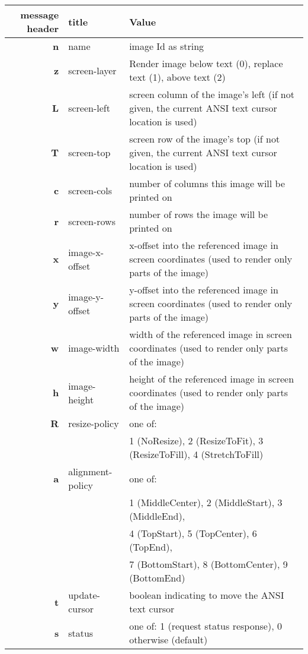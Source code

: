 \documentclass[a4paper]{article}
\begin{document}
\begin{tabular}{ |r|l|l| }
    \hline
    \textbf{message header}   & \textbf{title}   & \textbf{Value} \\
    \hline
    \textbf{n} & name             & image Id as string \\
    \textbf{z} & screen-layer     & Render image below text (0), replace text (1), above text (2) \\
    \textbf{L} & screen-left      & screen column of the image's left (if not given, the current ANSI text cursor location is used) \\
    \textbf{T} & screen-top       & screen row of the image's top (if not given, the current ANSI text cursor location is used) \\
    \textbf{c} & screen-cols      & number of columns this image will be printed on \\
    \textbf{r} & screen-rows      & number of rows the image will be printed on \\
    \textbf{x} & image-x-offset   & x-offset into the referenced image in screen coordinates (used to render only parts of the image) \\
    \textbf{y} & image-y-offset   & y-offset into the referenced image in screen coordinates (used to render only parts of the image) \\
    \textbf{w} & image-width      & width of the referenced image in screen coordinates (used to render only parts of the image) \\
    \textbf{h} & image-height     & height of the referenced image in screen coordinates (used to render only parts of the image) \\
    \textbf{R} & resize-policy    & one of: \\ %
               &                  & 1 (NoResize), 2 (ResizeToFit), 3 (ResizeToFill), 4 (StretchToFill) \\
    \textbf{a} & alignment-policy & one of: \\
               &                  & 1 (MiddleCenter), 2 (MiddleStart), 3 (MiddleEnd), \\
               &                  & 4 (TopStart), 5 (TopCenter), 6 (TopEnd), \\
               &                  & 7 (BottomStart), 8 (BottomCenter), 9 (BottomEnd) \\
    \textbf{t} & update-cursor    & boolean indicating to move the ANSI text cursor \\
    \textbf{s} & status           & one of: 1 (request status response), 0 otherwise (default) \\
    \hline
\end{tabular}
\end{document}
